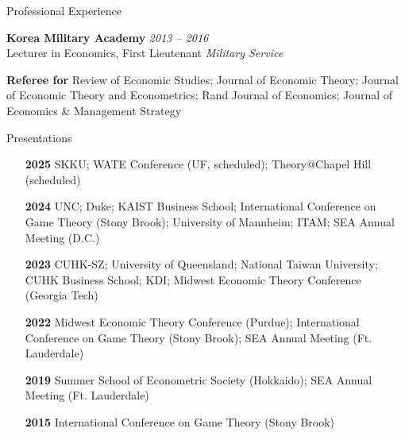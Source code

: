 \begin{rSection}{Professional Experience}
	
	{\bf Korea Military Academy} \hfill {\em 2013 -- 2016} \\[5pt] 
	Lecturer in Economics, First Lieutenant \hfill {\em Military Service}
	
	\medskip 
	
	{\bf Referee for } Review of Economic Studies; Journal of Economic Theory; Journal of Economic Theory and Econometrics; Rand Journal of Economics; Journal of Economics \& Management Strategy
	
\end{rSection}

\medskip


\begin{rSection}{Presentations}
	
	\begin{itemize}
		\item [\textbf{2025}] SKKU; WATE Conference (UF, scheduled); Theory@Chapel Hill (scheduled)
		\item [\textbf{2024}] UNC; Duke; KAIST Business School; International Conference on Game Theory (Stony Brook); University of Mannheim; ITAM; SEA Annual Meeting (D.C.)
		\item [\textbf{2023}] CUHK-SZ; University of Queensland; National Taiwan University; CUHK Business School; KDI; Midwest Economic Theory Conference (Georgia Tech)
		\item [\textbf{2022}] Midwest Economic Theory Conference (Purdue); International Conference on Game Theory (Stony Brook); SEA Annual Meeting (Ft. Lauderdale)
		\item [\textbf{2019}] Summer School of Econometric Society (Hokkaido); SEA Annual Meeting (Ft. Lauderdale)
		\item [\textbf{2015}] International Conference on Game Theory (Stony Brook)
	\end{itemize}
	
	
\end{rSection}

\medskip

